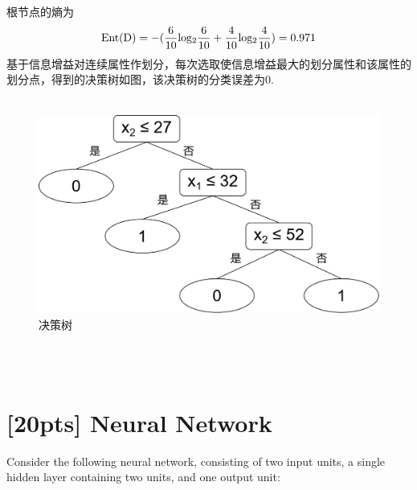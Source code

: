 \documentclass{article}
\begin{document}
    根节点的熵为
    \begin{equation}
        {\rm Ent(D)} = -(\frac{6}{10} {\rm log_2} \frac{6}{10} + \frac{4}{10} {\rm log_2} \frac{4}{10}) = 0.971
    \end{equation}
    基于信息增益对连续属性作划分，每次选取使信息增益最大的划分属性和该属性的划分点，得到的决策树如图，该决策树的分类误差为0.\\\\
    \begin{figure}
        \centering
        \includegraphics[width=.7\textwidth]{T1_decision_tree.png}
        \caption{决策树}
    \end{figure}
    \\\\
	\section{[20pts] Neural Network}
	Consider the following neural network, consisting of two input units, a single hidden layer containing two units, and one output unit:
	
\end{document}
